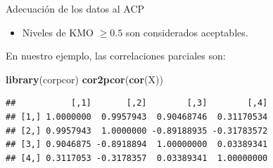 \documentclass[
  ignorenonframetext,
]{beamer}
\newenvironment{Shaded}{\begin{snugshade}}{\end{snugshade}}
\newcommand{\FunctionTok}[1]{\textcolor[rgb]{0.13,0.29,0.53}{\textbf{#1}}}
\newcommand{\NormalTok}[1]{#1}
\providecommand{\tightlist}{%
  \setlength{\itemsep}{0pt}\setlength{\parskip}{0pt}}
\begin{document}
\begin{frame}[fragile]{Adecuación de los datos al ACP}
\label{adecuaciuxf3n-de-los-datos-al-acp-2}
\begin{itemize}
\tightlist
\item
  Niveles de KMO \(\geq 0.5\) son considerados aceptables.
\end{itemize}

En nuestro ejemplo, las correlaciones parciales son:

\begin{Shaded}
\begin{Highlighting}[]
\FunctionTok{library}\NormalTok{(corpcor)}
\FunctionTok{cor2pcor}\NormalTok{(}\FunctionTok{cor}\NormalTok{(X))}
\end{Highlighting}
\end{Shaded}

\begin{verbatim}
##           [,1]       [,2]        [,3]        [,4]
## [1,] 1.0000000  0.9957943  0.90468746  0.31170534
## [2,] 0.9957943  1.0000000 -0.89188935 -0.31783572
## [3,] 0.9046875 -0.8918894  1.00000000  0.03389341
## [4,] 0.3117053 -0.3178357  0.03389341  1.00000000
\end{verbatim}
\end{frame}
\end{document}

